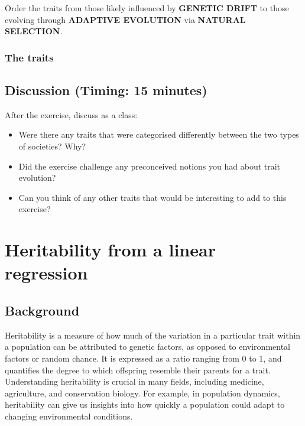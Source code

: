 \documentclass[
  a4paper]{book}
\providecommand{\tightlist}{%
  \setlength{\itemsep}{0pt}\setlength{\parskip}{0pt}}
\begin{document}
Order the traits from those likely influenced by \textbf{GENETIC DRIFT} to those evolving through \textbf{ADAPTIVE EVOLUTION} via \textbf{NATURAL SELECTION}.

\hypertarget{the-traits}{%
\subsection{The traits}\label{the-traits}}

\hypertarget{discussion-timing-15-minutes}{%
\section{Discussion (Timing: 15 minutes)}\label{discussion-timing-15-minutes}}

After the exercise, discuss as a class:

\begin{itemize}
\tightlist
\item
  Were there any traits that were categorised differently between the two types of societies? Why?
\item
  Did the exercise challenge any preconceived notions you had about trait evolution?
\item
  Can you think of any other traits that would be interesting to add to this exercise?
\end{itemize}

\hypertarget{heritability-from-a-linear-regression}{%
\chapter{Heritability from a linear regression}\label{heritability-from-a-linear-regression}}

\hypertarget{background-12}{%
\section{Background}\label{background-12}}

Heritability is a measure of how much of the variation in a particular trait within a population can be attributed to genetic factors, as opposed to environmental factors or random chance. It is expressed as a ratio ranging from 0 to 1, and quantifies the degree to which offspring resemble their parents for a trait. Understanding heritability is crucial in many fields, including medicine, agriculture, and conservation biology. For example, in population dynamics, heritability can give us insights into how quickly a population could adapt to changing environmental conditions.
\end{document}
